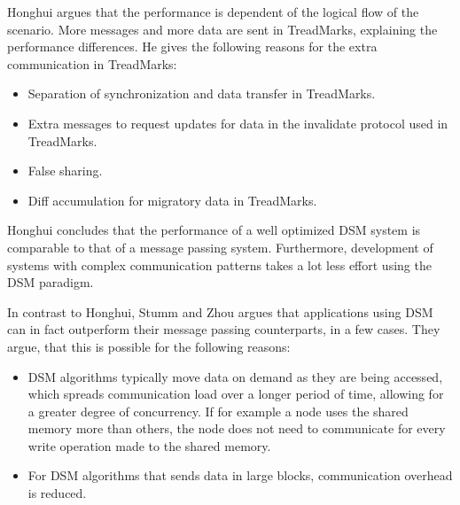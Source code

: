 Honghui argues that the performance is dependent of the logical flow of the scenario. More messages and more data are sent in TreadMarks, explaining the performance differences. He gives the following reasons for the extra communication in TreadMarks:

\begin{itemize}
	\item Separation of synchronization and data transfer in TreadMarks. 
	\item Extra messages to request updates for data in the invalidate protocol used in TreadMarks.
	\item False sharing.
	\item Diff accumulation for migratory data in TreadMarks.
\end{itemize} 





Honghui concludes that the performance of a well optimized DSM system is comparable to that of a message passing system. Furthermore, development of systems with complex communication patterns takes a lot less effort using the DSM paradigm.

In contrast to Honghui, Stumm and Zhou \cite{stumm1990algorithms} argues that applications using DSM can in fact outperform their message passing counterparts, in a few cases. They argue, that this is possible for the following reasons:

\begin{itemize}
 	\item DSM algorithms typically move data on demand as they are being accessed, which spreads communication load over a longer period of time, allowing for a greater degree of concurrency. If for example a node uses the shared memory more than others, the node does not need to communicate for every write operation made to the shared memory.
 	\item For DSM algorithms that sends data in large blocks, communication overhead is reduced. 
\end{itemize} 
 


